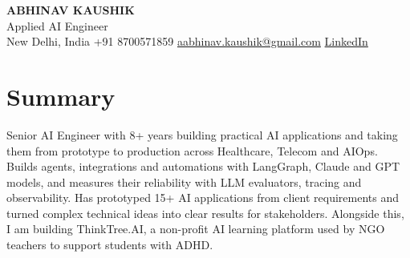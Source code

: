 \documentclass[10pt,a4paper]{article}
\begin{document}
\begin{center}
  {\LARGE\bfseries ABHINAV KAUSHIK}\\[2pt]
  {\large Applied AI Engineer}\\[2pt]
  New Delhi, India \textbar{} +91 8700571859 \textbar{} \href{mailto:aabhinav.kaushik@gmail.com}{aabhinav.kaushik@gmail.com} \textbar{} \href{https://www.linkedin.com/in/abhinav-kaushik10/}{LinkedIn}  
\end{center}

\section{Summary}
Senior AI Engineer with 8+ years building practical AI applications and taking them from prototype to production across Healthcare, Telecom and AIOps. Builds agents, integrations and automations with LangGraph, Claude and GPT models, and measures their reliability with LLM evaluators, tracing and observability. Has prototyped 15+ AI applications from client requirements and turned complex technical ideas into clear results for stakeholders. Alongside this, I am building ThinkTree.AI, a non-profit AI learning platform used by NGO teachers to support students with ADHD.
\end{document}
